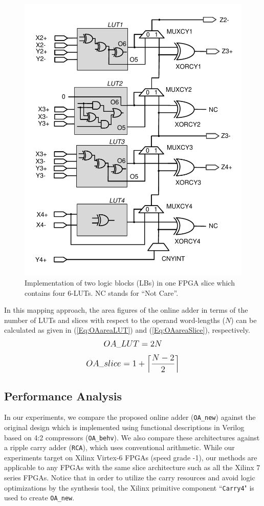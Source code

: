 \documentclass[conference]{IEEEtran}
\begin{document}
\begin{figure}[tbp]
	\centering
	\includegraphics[width=.49\textwidth]{./Figures/SDadder_FastCarry_New2.pdf}
	\vspace{-5ex}
	\caption{Implementation of two logic blocks (LBs) in one FPGA slice which contains four 6-LUTs. NC stands for ``Not Care''.}
	\vspace{-2ex}	
	\label{Fig:SliceNew}
\end{figure}

In this mapping approach, the area figures of the online adder in terms of the number of LUTs and slices with respect to the operand word-lengths ($N$) can be calculated as given in (\ref{Eq:OAareaLUT}) and (\ref{Eq:OAareaSlice}), respectively.\vspace{-0.5ex}
%
\begin{eqnarray}\label{Eq:OAareaLUT}
\scriptsize
	OA\_LUT = 2N
\normalsize
\vspace{-0.5ex}
\end{eqnarray}
%
\begin{eqnarray}\label{Eq:OAareaSlice}
\footnotesize
	OA\_slice = 1+\left\lceil\frac{N-2}{2}\right\rceil
\normalsize
\end{eqnarray}

\subsection{Performance Analysis}\label{subsec:OA_Performance}\vspace{-0.5ex}
In our experiments, we compare the proposed online adder (\texttt{OA\_new}) against the original design which is implemented using functional descriptions in Verilog based on 4:2 compressors (\texttt{OA\_behv}).  We also compare these architectures against a ripple carry adder (\texttt{RCA}), which uses conventional arithmetic. While our experiments target on Xilinx Virtex-6 FPGAs (speed grade -1), our methods are applicable to any FPGAs with the same slice architecture such as all the Xilinx 7 series FPGAs. Notice that in order to utilize the carry resources and avoid logic optimizations by the synthesis tool, the Xilinx primitive component ``\texttt{Carry4}" is used to create \texttt{OA\_new}.\vspace{-0.5ex}
\end{document}
